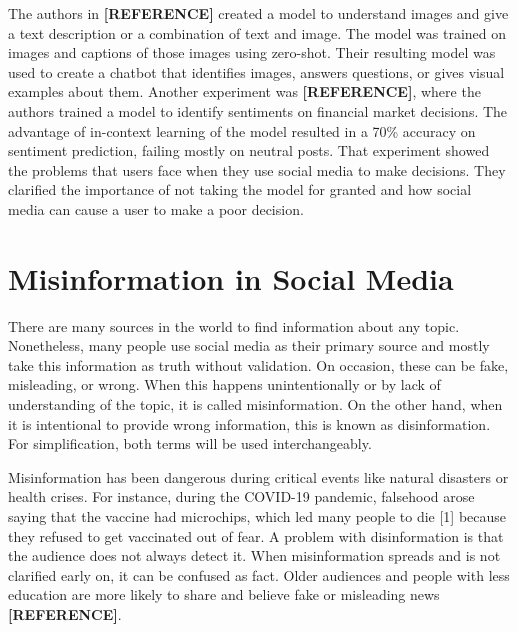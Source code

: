 The authors in \textbf{[REFERENCE]} created a model to understand images and give a text description or a combination of text and image. The model was trained on images and captions of those
images using zero-shot. Their resulting model was used to create a chatbot that identifies images, answers questions, or gives visual examples about them. Another experiment was \textbf{[REFERENCE]},
where the authors trained a model to identify sentiments on financial market decisions. The advantage of in-context learning of the model resulted in a 70\% accuracy on sentiment prediction,
failing mostly on neutral posts. That experiment showed the problems that users face when they use social media to make decisions. They clarified the importance of not taking the model for granted
and how social media can cause a user to make a poor decision.  


\section{Misinformation in Social Media}
There are many sources in the world to find information about any topic. Nonetheless, many people use social media as their primary source and mostly take this information as truth without
validation. On occasion, these can be fake, misleading, or wrong. When this happens unintentionally or by lack of understanding of the topic, it is called misinformation. On the other hand,
when it is intentional to provide wrong information, this is known as disinformation. For simplification, both terms will be used interchangeably.

Misinformation has been dangerous during critical events like natural disasters or health crises. For instance, during the COVID-19 pandemic, falsehood arose saying that the vaccine had
microchips, which led many people to die [1] because they refused to get vaccinated out of fear. A problem with disinformation is that the audience does not always detect it. When misinformation
spreads and is not clarified early on, it can be confused as fact. Older audiences and people with less education are more likely to share and believe fake or misleading news \textbf{[REFERENCE]}. 

